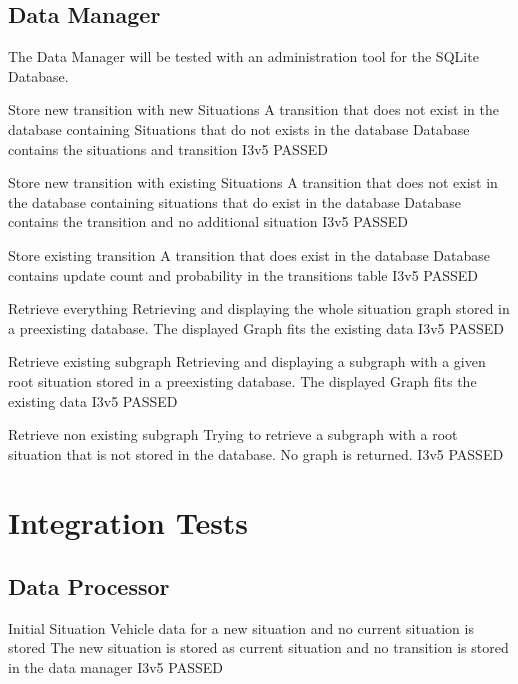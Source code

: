 \documentclass[a4paper, 11pt]{scrreprt}
\begin{document}
\section{Data Manager}

	The Data Manager will be tested with an administration tool for the SQLite Database.
	
	{Store new transition with new Situations}
	{A transition that does not exist in the database containing Situations that do not exists in the database}
	{Database contains the situations and transition}
	{I3v5}
	{PASSED}
	
	{Store new transition with existing Situations}
	{A transition that does not exist in the database containing situations that do exist in the database}
	{Database contains the transition and no additional situation}
	{I3v5}
	{PASSED}
	
	{Store existing transition}
	{A transition that does exist in the database}
	{Database contains update count and probability in the transitions table}
	{I3v5}
	{PASSED}
	
	{Retrieve everything}
	{Retrieving and displaying the whole situation graph stored in a preexisting database.}
	{The displayed Graph fits the existing data}
	{I3v5}
	{PASSED}
	
	{Retrieve existing subgraph}
	{Retrieving and displaying a subgraph with a given root situation stored in a preexisting database.}
	{The displayed Graph fits the existing data}
	{I3v5}
	{PASSED}
	
	{Retrieve non existing subgraph}
	{Trying to retrieve a subgraph with a root situation that is not stored in the database.}
	{No graph is returned.}
	{I3v5}
	{PASSED}
	
\chapter{Integration Tests}

\section{Data Processor}

	{Initial Situation}
	{Vehicle data for a new situation and no current situation is stored}
	{The new situation is stored as current situation and no transition is stored in the data manager}
	{I3v5}
	{PASSED}
	
\end{document}
